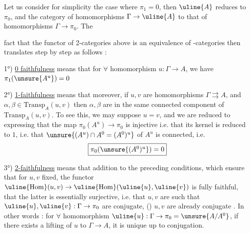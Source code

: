 Let us consider for simplicity the case where \(\pi_1=0\), then \(\uline{A}\) reduces to \(\pi_0\), and the category of homomorphisms \(\Gamma\to\uline{A}\) to that of homomorphisms \(\Gamma\to\pi_0\). The



fact that the functor of 2-categories above  is an equivalence of -categories then translates step by step as follows :

1°) \uline{0 faithfulness} means that for \(\forall\) homomorphism \(u:\Gamma\to A\), we have \(\pi_1(\unsure{A^u})=0\)


2°) \uline{1-faithfulness} means that moreover, if \(u,v\) are  homomorphisms \(\Gamma\rightrightarrows A\), and  \(\alpha,\beta\in\mathrm{Transp}_A(u,v)\)     then \(\alpha,\beta\) are in the same  connected component of \(\mathrm{Transp}_A(u,v)\).    To see this, we may suppose \(u=v\), and  we are reduced to expressing that the map \(\pi_0(A^u)\to\pi_0\) is injective i.e. that  its kernel is reduced to \(1\), i.e. that  \(\unsure{(A^u)\cap A^0=(A^0)^u}\) of \(A^u\) is connected, i.e.
\[
\fbox{\(\pi_0(\unsure{(A^0)^u})=0\)}
\]



3°) \uline{2-faithfulness} means that  addition to the preceding conditions, which ensure that for \(u,v\) fixed, the functor \(\uline{\mathrm{Hom}}(u,v)\to\uline{\mathrm{Hom}}(\uline{u},\uline{v})\) is fully faithful, that the latter is essentially surjective, i.e. that  \(u,v\) are such that \(\uline{u},\uline{v}:\Gamma\to\pi_0\) are conjugate,  () \(u,v\) are already conjugate . In other words : for \(\forall\) homomorphism \(\uline{u}:\Gamma\to\pi_0=\unsure{A/A^0}\), if there exists a lifting of \(u\) to \(\Gamma\to A\), it is unique up to conjugation.


